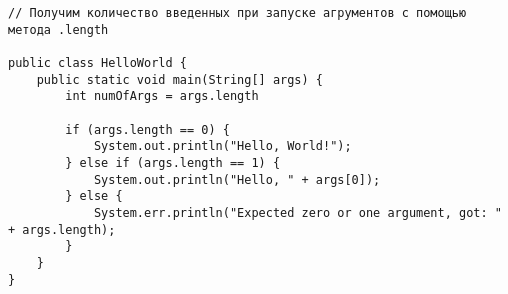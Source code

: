 \begin{verbatim}
// Получим количество введенных при запуске агрументов с помощью метода .length

public class HelloWorld {
    public static void main(String[] args) {
        int numOfArgs = args.length 
        
        if (args.length == 0) {
            System.out.println("Hello, World!");
        } else if (args.length == 1) {
            System.out.println("Hello, " + args[0]);
        } else {
            System.err.println("Expected zero or one argument, got: " + args.length);
        }
    }
}
\end{verbatim}

\vspace{0.4cm}

